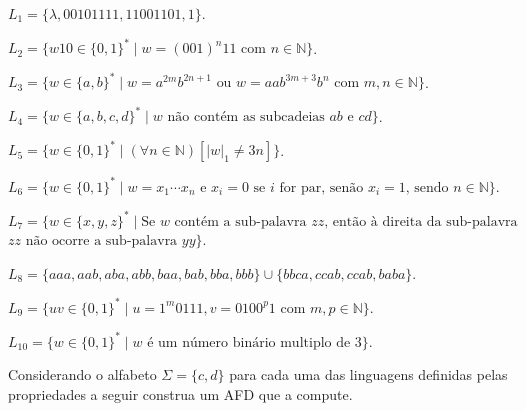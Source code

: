 \begin{exerList}
	\item $L_1 = \{\lambda, 00101111, 11001101, 1\}$.
	\item $L_2 = \{w10 \in \{0,1\}^* \mid w = (001)^n11 \text{ com } n \in \mathbb{N}\}$.
	\item $L_3 = \{w \in \{a,b\}^* \mid w = a^{2m}b^{2n+1} \text{ ou } w = aab^{3m + 3}b^n \text{ com } m,n \in \mathbb{N}\}$.
	\item $L_4 = \{w \in \{a,b,c,d\}^* \mid w \text{ não contém as subcadeias } ab \text{ e } cd\}$.
	\item $L_5 = \{w \in \{0,1\}^* \mid (\forall n \in \mathbb{N})[|w|_1 \neq 3n]\}$.
	\item $L_6 = \{w \in \{0,1\}^* \mid w = x_1\cdots x_n \text{ e } x_i = 0 \text{ se } i \text{ for par, senão } x_i = 1 \text{, sendo } n \in \mathbb{N}\}$.
	\item $L_7 = \{w \in \{x, y, z\}^* \mid \text{Se } w \text{ contém a sub-palavra } zz \text{, então à  direita da sub-palavra }$ $zz \text{ não ocorre a sub-palavra } yy \}$.
	\item $L_8 = \{aaa, aab, aba, abb, baa, bab, bba, bbb\} \cup \{bbca, ccab, ccab, baba\}$.
	\item $L_9 = \{uv \in \{0,1\}^* \mid u = 1^m0111, v = 0100^p1 \text{ com } m, p \in \mathbb{N}\}$.
	\item $L_{10} = \{w \in \{0,1\}^* \mid w \text{ é um número binário multiplo de  } 3\}$.
\end{exerList}

\begin{problem}\label{prob:Regulares3}
	Considerando o alfabeto $\Sigma = \{c, d\}$ para cada uma das linguagens definidas pelas propriedades a seguir construa um AFD que a compute.
\end{problem}

